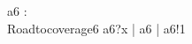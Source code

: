 %

\begin{circus}
\circchannel a6 : \nat \\
\circprocess Roadtocoverage6 \circdef \circbegin
	\circspot
	    a6?x \then \Skip \lpar | \lchanset a6 \rchanset 
	      | \rpar a6!1 \then \Skip
	    \\
	\circend
\end{circus}
